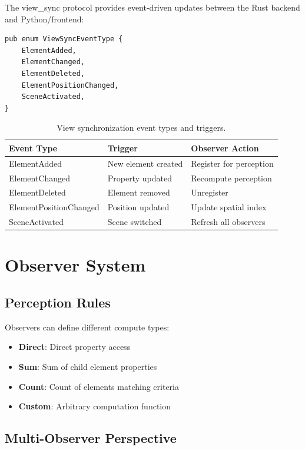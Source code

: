 \documentclass{article}
\begin{document}
The view\_sync protocol provides event-driven updates between the Rust backend and Python/frontend:

\begin{verbatim}
pub enum ViewSyncEventType {
    ElementAdded,
    ElementChanged,
    ElementDeleted,
    ElementPositionChanged,
    SceneActivated,
}
\end{verbatim}

\begin{table}[h]
\centering
\caption{View synchronization event types and triggers.}
\label{tab:view-sync}
\begin{tabular}{lll}
\toprule
\textbf{Event Type} & \textbf{Trigger} & \textbf{Observer Action} \\
\midrule
ElementAdded & New element created & Register for perception \\
ElementChanged & Property updated & Recompute perception \\
ElementDeleted & Element removed & Unregister \\
ElementPositionChanged & Position updated & Update spatial index \\
SceneActivated & Scene switched & Refresh all observers \\
\bottomrule
\end{tabular}
\end{table}

\section{Observer System}

\subsection{Perception Rules}

Observers can define different compute types:

\begin{itemize}
\item \textbf{Direct}: Direct property access
\item \textbf{Sum}: Sum of child element properties
\item \textbf{Count}: Count of elements matching criteria
\item \textbf{Custom}: Arbitrary computation function
\end{itemize}

\subsection{Multi-Observer Perspective}
\end{document}
